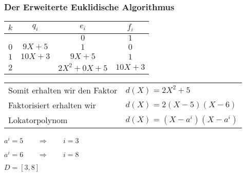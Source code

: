\documentclass[11pt,aspectratio=169]{beamer}
\begin{document}
	\begin{frame}
		\frametitle{Der Erweiterte Euklidische Algorithmus}
		
		\begin{center}
			
		\begin{tabular}{| c | c | c c |}
			\hline
			$k$ &  $q_i$ & $e_i$ & $f_i$\\
			\hline 
			& & $0$& $1$\\
			$0$& $9X + 5$& $1$& $0$\\
			$1$& $10X + 3$& $9X+5$& $1$\\
			$2$& & $2X^2 + 0X + 5$& $10X + 3$\\
			\hline
		\end{tabular}	
			
		\end{center}
		
		\vspace{10pt}
		
		\begin{tabular}{ll}
			Somit erhalten wir den Faktor& $d(X) = 2X^2 + 5$\\
			Faktorisiert erhalten wir& $d(X) = 2(X-5)(X-6)$\\
			Lokatorpolynom& $d(X) = (X-a^i)(X-a^i)$
		\end{tabular}
		
		\vspace{10pt}
		
		\begin{center}
			$a^i = 5 \qquad \Rightarrow \qquad i = 3$
			
			$a^i = 6 \qquad \Rightarrow \qquad i = 8$
		\end{center}
		
	$D = [3,8]$
		
	\end{frame}
\end{document}
